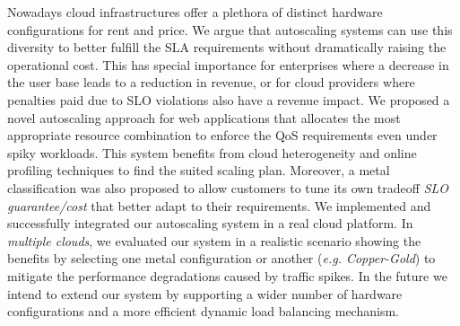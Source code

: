 
Nowadays cloud infrastructures offer a plethora of distinct hardware configurations for rent and price. We argue that autoscaling systems can use this diversity to better fulfill the SLA requirements without dramatically raising the operational cost. This has special importance for enterprises where a decrease in the user base leads to a reduction in revenue, or for cloud providers where penalties paid due to SLO violations also have a revenue impact. We proposed a novel autoscaling approach for web applications that allocates the most appropriate resource combination to enforce the QoS requirements even under spiky workloads. This system benefits from cloud heterogeneity and online profiling techniques to find the suited scaling plan. Moreover, a metal classification was also proposed to allow customers to tune its own tradeoff \emph{SLO guarantee/cost} that better adapt to their requirements. We implemented and successfully integrated our autoscaling system in a real cloud platform. In \emph{multiple clouds}, we evaluated our system in a realistic scenario showing the benefits by selecting one metal configuration or another (\emph{e.g. Copper-Gold}) to mitigate the performance degradations caused by traffic spikes. In the future we intend to extend our system by supporting a wider number of hardware configurations and a more efficient dynamic load balancing mechanism. %









